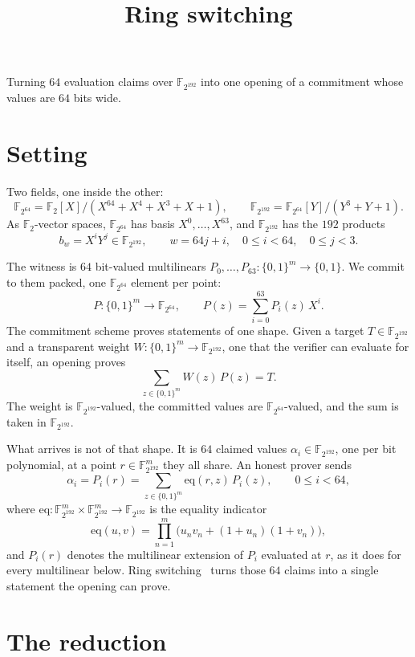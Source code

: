 \documentclass[11pt]{article}
\title{\textbf{Ring switching}}
\author{}
\date{}
\newcommand{\F}{\mathbb{F}}
\newcommand{\eq}{\mathrm{eq}}
\begin{document}
\maketitle
\vspace{-3em}
\begin{center}
Turning $64$ evaluation claims over $\F_{2^{192}}$ into one opening of a commitment whose values are $64$ bits wide.
\end{center}

\section*{Setting}

Two fields, one inside the other:
\[
\F_{2^{64}}=\F_2[X]/(X^{64}+X^4+X^3+X+1),
\qquad
\F_{2^{192}}=\F_{2^{64}}[Y]/(Y^3+Y+1).
\]
As $\F_2$-vector spaces, $\F_{2^{64}}$ has basis $X^0,\dots,X^{63}$, and $\F_{2^{192}}$ has the $192$ products
\[
b_w=X^iY^j\in\F_{2^{192}},\qquad w=64j+i,\quad 0\le i<64,\quad 0\le j<3.
\]

The witness is $64$ bit-valued multilinears $P_0,\dots,P_{63}:\{0,1\}^m\to\{0,1\}$. We commit to them packed, one $\F_{2^{64}}$ element per point:
\[
P:\{0,1\}^m\to\F_{2^{64}},\qquad P(z)=\sum_{i=0}^{63}P_i(z)\,X^i.
\]
The commitment scheme proves statements of one shape. Given a target $T\in\F_{2^{192}}$ and a transparent weight $W:\{0,1\}^m\to\F_{2^{192}}$, one that the verifier can evaluate for itself, an opening proves
\[
\sum_{z\in\{0,1\}^m}W(z)\,P(z)=T.
\]
The weight is $\F_{2^{192}}$-valued, the committed values are $\F_{2^{64}}$-valued, and the sum is taken in $\F_{2^{192}}$.

What arrives is not of that shape. It is $64$ claimed values $\alpha_i\in\F_{2^{192}}$, one per bit polynomial, at a point $r\in\F_{2^{192}}^m$ they all share. An honest prover sends
\[
\alpha_i=P_i(r)=\sum_{z\in\{0,1\}^m}\eq(r,z)\,P_i(z),\qquad 0\le i<64,
\]
where $\eq:\F_{2^{192}}^m\times\F_{2^{192}}^m\to\F_{2^{192}}$ is the equality indicator
\[
\eq(u,v)=\prod_{n=1}^m\bigl(u_nv_n+(1+u_n)(1+v_n)\bigr),
\]
and $P_i(r)$ denotes the multilinear extension of $P_i$ evaluated at $r$, as it does for every multilinear below.
Ring switching~\cite{DP26} turns those $64$ claims into a single statement the opening can prove.

\section*{The reduction}
\end{document}
